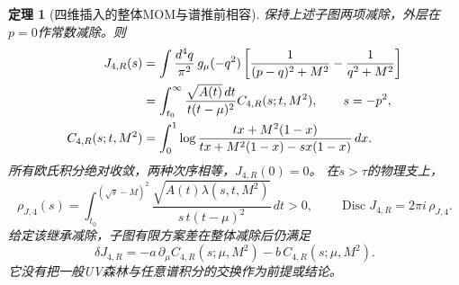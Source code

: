 \documentclass[11pt,a4paper]{ctexart}
\theoremstyle{cnplain}\newtheorem{theorem}{定理}[section]
\theoremstyle{definition}\newtheorem{definition}[theorem]{定义}
\theoremstyle{remark}\newtheorem{remark}[theorem]{注}
\begin{document}
\begin{theorem}[四维插入的整体MOM与谱推前相容]\label{thm:fourinsertmom}
保持上述子图两项减除，外层在$p=0$作常数减除。则
\begin{align}
 J_{4,R}(s)
 &=\int\frac{d^4q}{\pi^2}\,g_\mu(-q^2)
       \left[\frac1{(p-q)^2+M^2}-\frac1{q^2+M^2}\right]\notag\\
 &=\int_{t_0}^{\infty}
       \frac{\sqrt{A(t)}\,dt}{t(t-\mu)^2}
                  C_{4,R}(s;t,M^2),\qquad s=-p^2,
 \label{eq:fourinsertmom}\\
 C_{4,R}(s;t,M^2)
 &=\int_0^1\log
       \frac{tx+M^2(1-x)}
            {tx+M^2(1-x)-s x(1-x)}\,dx .
\end{align}
所有欧氏积分绝对收敛，两种次序相等，$J_{4,R}(0)=0$。
在$s>\tau$的物理支上，
\begin{equation}\label{eq:fourinsertcut}
 \rho_{J,4}(s)=
 \int_{t_0}^{(\sqrt s-M)^2}
 \frac{\sqrt{A(t)\lambda(s,t,M^2)}}
      {s\,t(t-\mu)^2}\,dt>0,\qquad
 \operatorname{Disc}J_{4,R}=2\pi i\,\rho_{J,4}.
\end{equation}
给定该继承减除，子图有限方案差在整体减除后仍满足
\[
 \delta J_{4,R}
      =-a\,\partial_\mu C_{4,R}(s;\mu,M^2)
                       -b\,C_{4,R}(s;\mu,M^2).
\]
它没有把一般UV森林与任意谱积分的交换作为前提或结论。
\end{theorem}
\end{document}
